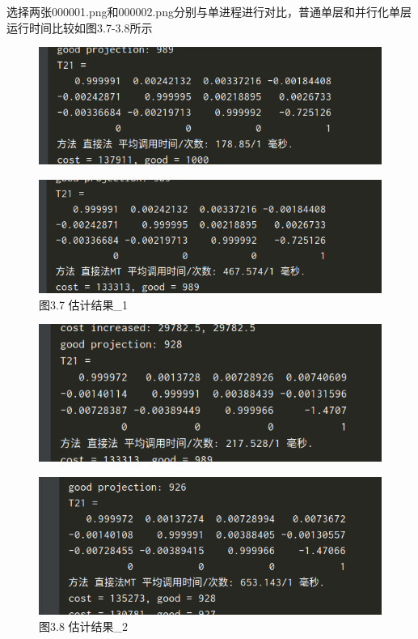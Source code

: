 \documentclass[40pt,a4paper，UTF8]{ctexart}
\numberwithin{equation}{section}
\begin{document}
选择两张000001.png和000002.png分别与单进程进行对比，普通单层和并行化单层运行时间比较如图3.7-3.8所示
\begin{figure}[H]
\centering
\includegraphics[width=4.8in]{ch6_3_8_1.png} 
\end{figure}

\begin{figure}[H]
\centering
\includegraphics[width=4.8in]{ch6_3_8_2.png} {图3.7 估计结果\_1}
\end{figure}

\begin{figure}[H]
\centering
\includegraphics[width=4.8in]{ch6_3_8_3.png} 
\end{figure}

\begin{figure}[H]
\centering
\includegraphics[width=4.8in]{ch6_3_8_4.png} {图3.8 估计结果\_2}
\end{figure}
\end{document}
